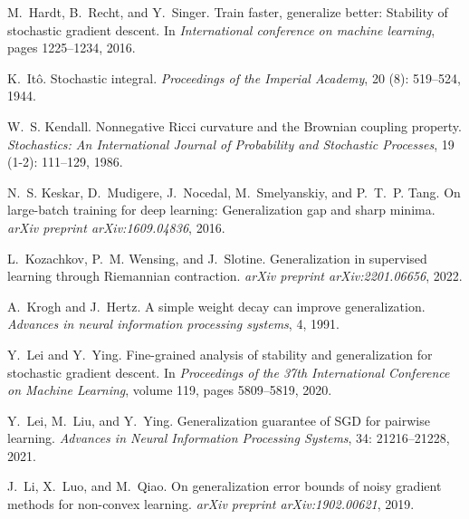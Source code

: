 \documentclass{article}
\begin{document}
\begin{thebibliography}{47}
M.~Hardt, B.~Recht, and Y.~Singer.
\newblock Train faster, generalize better: Stability of stochastic gradient descent.
\newblock In \emph{International conference on machine learning}, pages 1225--1234, 2016.

K.~It\^o.
\newblock Stochastic integral.
\newblock \emph{Proceedings of the Imperial Academy}, 20 (8): 519--524, 1944.

W.~S. Kendall.
\newblock Nonnegative {R}icci curvature and the {B}rownian coupling property.
\newblock \emph{Stochastics: An International Journal of Probability and Stochastic Processes}, 19 (1-2): 111--129, 1986.

N.~S. Keskar, D.~Mudigere, J.~Nocedal, M.~Smelyanskiy, and P.~T.~P. Tang.
\newblock On large-batch training for deep learning: Generalization gap and sharp minima.
\newblock \emph{arXiv preprint arXiv:1609.04836}, 2016.

L.~Kozachkov, P.~M. Wensing, and J.~Slotine.
\newblock Generalization in supervised learning through {R}iemannian contraction.
\newblock \emph{arXiv preprint arXiv:2201.06656}, 2022.

A.~Krogh and J.~Hertz.
\newblock A simple weight decay can improve generalization.
\newblock \emph{Advances in neural information processing systems}, 4, 1991.

Y.~Lei and Y.~Ying.
\newblock Fine-grained analysis of stability and generalization for stochastic gradient descent.
\newblock In \emph{Proceedings of the 37th International Conference on Machine Learning}, volume 119, pages 5809--5819, 2020.

Y.~Lei, M.~Liu, and Y.~Ying.
\newblock Generalization guarantee of {SGD} for pairwise learning.
\newblock \emph{Advances in Neural Information Processing Systems}, 34: 21216--21228, 2021.

J.~Li, X.~Luo, and M.~Qiao.
\newblock On generalization error bounds of noisy gradient methods for non-convex learning.
\newblock \emph{arXiv preprint arXiv:1902.00621}, 2019{}.


\end{thebibliography}
\end{document}
